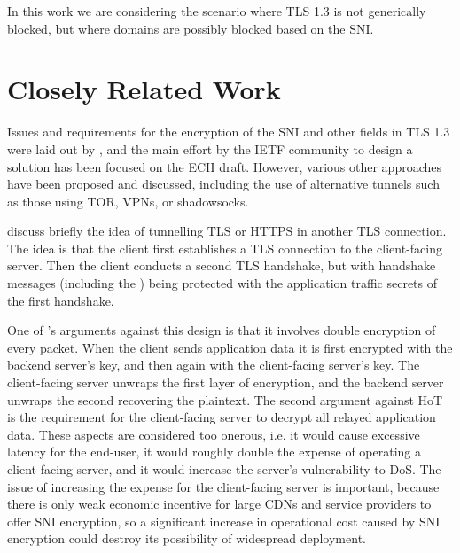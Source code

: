 In this work we are considering the scenario where \ac{TLS} 1.3 is not generically blocked,
but where domains are possibly blocked based on the \ac{SNI}.





\section{Closely Related Work}

Issues and requirements for the encryption of the \ac{SNI} and other fields in \ac{TLS} 1.3 were laid out by \cite{rfc8744-issues}, and the main effort by the \ac{IETF} community to design a solution has been focused on the \ac{ECH} draft.
However, various other approaches
have been proposed and discussed,
including the use of alternative tunnels such as those using
TOR, \acp{VPN}, or shadowsocks.

\cite{rfc8744-issues} discuss briefly the idea of tunnelling \ac{TLS} or \ac{HTTPS} in another \ac{TLS} connection. The idea is that the client first establishes a \ac{TLS} connection to the client-facing server. Then the client conducts a second \ac{TLS} handshake, but with handshake messages (including the ) being protected with the application traffic secrets of the first handshake.

One of \citeauthor{rfc8744-issues}'s arguments against this design is that it involves double encryption of every packet. When the client sends application data it is first encrypted with the backend server's key, and then again with the client-facing server's key. The client-facing server unwraps the first layer of encryption, and the backend server unwraps the second recovering the plaintext. The second argument against \ac{HoT} is the requirement for the client-facing server to decrypt all relayed application data. These aspects are considered too onerous, i.e. it would cause excessive latency for the end-user, it would roughly double the expense of operating a client-facing server, and it would increase the server's vulnerability to \ac{DoS}. The issue of increasing the expense for the client-facing server is important, because there is only weak economic incentive for large \acp{CDN} and service providers to offer \ac{SNI} encryption, so a significant increase in operational cost caused by \ac{SNI} encryption could destroy its possibility of widespread deployment.

